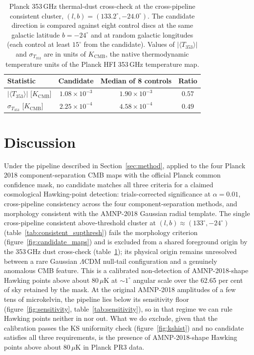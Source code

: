 \documentclass[a4paper,11pt]{article}
\begin{document}
\begin{table}[t]
\centering
\caption{Planck 353\,GHz thermal-dust cross-check at the cross-pipeline consistent cluster, $(l, b) = (133.2^\circ, -24.0^\circ)$. The candidate direction is compared against eight control discs at the same galactic latitude $b = -24^\circ$ and at random galactic longitudes (each control at least $15^\circ$ from the candidate). Values of $|\langle T_{353} \rangle|$ and $\sigma_{T_{353}}$ are in units of $K_\mathrm{CMB}$, the native thermodynamic temperature units of the Planck HFI 353\,GHz temperature map.}
\label{tab:dust_check}
\small
\begin{tabular}{lccc}
\toprule
Statistic & Candidate & Median of 8 controls & Ratio \\
\midrule
$|\langle T_{353} \rangle|$ [$K_\mathrm{CMB}$] & $1.08 \times 10^{-3}$ & $1.90 \times 10^{-3}$ & $0.57$ \\
$\sigma_{T_{353}}$ [$K_\mathrm{CMB}$]          & $2.25 \times 10^{-4}$ & $4.58 \times 10^{-4}$ & $0.49$ \\
\bottomrule
\end{tabular}
\end{table}

\section{Discussion}\label{sec:discussion}

Under the pipeline described in Section~\ref{sec:method}, applied to the four Planck 2018 component-separation CMB maps with the official Planck common confidence mask, no candidate matches all three criteria for a claimed cosmological Hawking-point detection: trials-corrected significance at $\alpha = 0.01$, cross-pipeline consistency across the four component-separation methods, and morphology consistent with the AMNP-2018 Gaussian radial template. The single cross-pipeline consistent above-threshold cluster at $(l, b) \approx (133^\circ, -24^\circ)$ (table~\ref{tab:consistent_supthresh}) fails the morphology criterion (figure~\ref{fig:candidate_maps}) and is excluded from a shared foreground origin by the 353\,GHz dust cross-check (table~\ref{tab:dust_check}); its physical origin remains unresolved between a rare Gaussian $\Lambda$CDM null-tail configuration and a genuinely anomalous CMB feature. This is a calibrated non-detection of AMNP-2018-shape Hawking points above about $80\,\mu\mathrm{K}$ at $\sim 1^\circ$ angular scale over the 62.65 per cent of sky retained by the mask. At the original AMNP-2018 amplitudes of a few tens of microkelvin, the pipeline lies below its sensitivity floor (figure~\ref{fig:sensitivity}, table~\ref{tab:sensitivity}), so in that regime we can rule Hawking points neither in nor out. What we do exclude, given that the calibration passes the KS uniformity check (figure~\ref{fig:kshist}) and no candidate satisfies all three requirements, is the presence of AMNP-2018-shape Hawking points above about $80\,\mu\mathrm{K}$ in Planck PR3 data.
\end{document}
